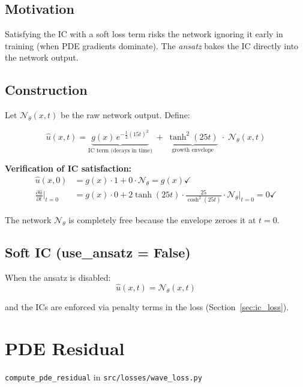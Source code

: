 \documentclass[11pt, a4paper]{article}
\newcommand{\fn}[1]{\texttt{\color{codeblue}#1}}
\newcommand{\file}[1]{\texttt{#1}}
\begin{document}
\subsection{Motivation}

Satisfying the IC with a soft loss term risks the network ignoring it early
in training (when PDE gradients dominate). The \emph{ansatz} bakes the IC
directly into the network output.

\subsection{Construction}

Let $\mathcal{N}_\theta(x,t)$ be the raw network output. Define:

\begin{equation}
  \hat{u}(x,t) =
  \underbrace{g(x)\,e^{-\frac{1}{2}(15t)^2}}_{\text{IC term (decays in time)}}
  \;+\;
  \underbrace{\tanh^2(25t)}_{\text{growth envelope}}\;\cdot\;\mathcal{N}_\theta(x,t)
  \label{eq:ansatz}
\end{equation}

\textbf{Verification of IC satisfaction:}
\begin{align}
  \hat{u}(x, 0) &= g(x)\cdot 1 + 0 \cdot \mathcal{N}_\theta = g(x) \checkmark \\
  \frac{\partial \hat{u}}{\partial t}\bigg|_{t=0}
    &= g(x)\cdot 0 + 2\tanh(25t)\cdot\frac{25}{\cosh^2(25t)}\cdot\mathcal{N}_\theta\bigg|_{t=0}
    = 0 \checkmark
\end{align}

The network $\mathcal{N}_\theta$ is completely free because the envelope zeroes
it at $t=0$.

\subsection{Soft IC (use\_ansatz = False)}

When the ansatz is disabled:
\begin{equation}
  \hat{u}(x,t) = \mathcal{N}_\theta(x,t)
\end{equation}

and the ICs are enforced via penalty terms in the loss (Section~\ref{sec:ic_loss}).


\section{PDE Residual}
\fn{compute\_pde\_residual} in \file{src/losses/wave\_loss.py}
\end{document}
